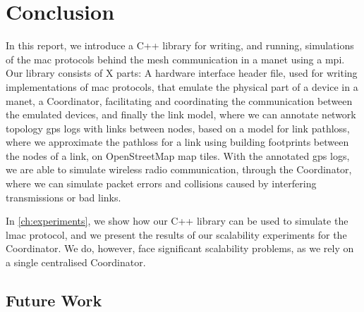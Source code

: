 \chapter{Conclusion}\label{ch:conclusion}
In this report, we introduce a C++ library for writing, and running, simulations of the \gls{mac} protocols
behind the mesh communication in a \gls{manet} using a \gls{mpi}. Our library consists of X parts: A hardware
interface header file, used for writing implementations of \gls{mac} protocols, that emulate the physical part
of a device in a \gls{manet}, a Coordinator, facilitating and coordinating the communication between the
emulated devices, and finally the link model, where we can annotate network topology \gls{gps} logs with links
between nodes, based on a model for link \gls{pathloss}, where we approximate the \gls{pathloss} for a link
using building footprints between the nodes of a link, on OpenStreetMap map tiles. With the annotated
\gls{gps} logs, we are able to simulate wireless radio communication, through the Coordinator, where we can
simulate packet errors and collisions caused by interfering transmissions or bad links. \smallbreak



In \autoref{ch:experiments}, we show how our C++ library can be used to simulate the \gls{lmac} protocol, and
we present the results of our scalability experiments for the Coordinator. We do, however, face significant
scalability problems, as we rely on a single centralised Coordinator.


\section{Future Work}

